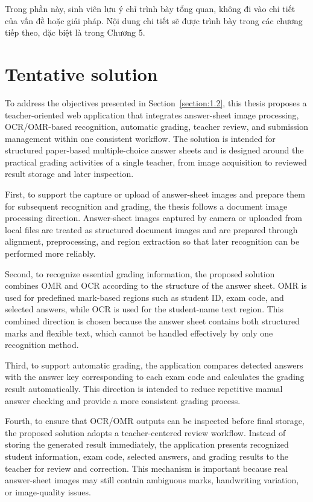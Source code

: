 \documentclass[../Main.tex]{subfiles}
\begin{document}
Trong phần này, sinh viên lưu ý chỉ trình bày tổng quan, không đi vào chi tiết của vấn đề hoặc giải pháp. Nội dung chi tiết sẽ được trình bày trong các chương tiếp theo, đặc biệt là trong Chương 5.

\fi
\section{Tentative solution}
\label{section:1.3}
To address the objectives presented in Section~\ref{section:1.2}, this thesis
proposes a teacher-oriented web application that integrates answer-sheet image
processing, OCR/OMR-based recognition, automatic grading, teacher review, and
submission management within one consistent workflow. The solution is intended
for structured paper-based multiple-choice answer sheets and is designed around
the practical grading activities of a single teacher, from image acquisition to
reviewed result storage and later inspection.

First, to support the capture or upload of answer-sheet images and prepare them
for subsequent recognition and grading, the thesis follows a document image
processing direction. Answer-sheet images captured by camera or uploaded from
local files are treated as structured document images and are prepared through
alignment, preprocessing, and region extraction so that later recognition can be
performed more reliably.

Second, to recognize essential grading information, the proposed solution
combines OMR and OCR according to the structure of the answer sheet. OMR is used
for predefined mark-based regions such as student ID,
exam code, and selected answers, while OCR is used for the student-name text
region. This combined direction is chosen because the answer sheet contains both
structured marks and flexible text, which cannot be handled effectively by only
one recognition method.

Third, to support automatic grading, the application compares detected answers
with the answer key corresponding to each exam code and calculates the grading
result automatically. This direction is intended to reduce repetitive manual
answer checking and provide a more consistent grading process.

Fourth, to ensure that OCR/OMR outputs can be inspected before final storage,
the proposed solution adopts a teacher-centered review workflow. Instead of
storing the generated result immediately, the application presents recognized
student information, exam code, selected answers, and grading results to the
teacher for review and correction. This mechanism is important because real
answer-sheet images may still contain ambiguous marks, handwriting variation, or
image-quality issues.
\end{document}
